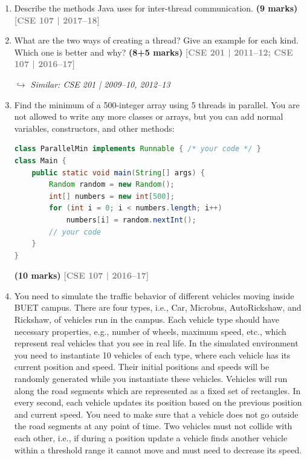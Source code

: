 \documentclass[12pt,a3paper]{article}
\newcommand{\yr}[1]{\hfill\textcolor{gray}{\small\textbf{[#1]}}}
\newcommand{\mk}[1]{\textcolor{orange!70!black}{\small\textbf{(#1 marks)}}}
\newcommand{\variant}[1]{\par\vspace{1pt}\textcolor{blue!50!black}%
  {\footnotesize\textit{$\hookrightarrow$ Similar: #1}}}
\begin{document}
\begin{enumerate}



\item Describe the methods Java uses for inter-thread communication. \mk{9}
\yr{CSE 107 | 2017--18}




\item What are the two ways of creating a thread? Give an example for each kind. Which one is better and why? \mk{8+5}
\yr{CSE 201 | 2011--12; CSE 107 | 2016--17}
\variant{CSE 201 | 2009--10, 2012--13}




\item Find the minimum of a 500-integer array using 5 threads in parallel. You are not allowed to write any more classes or arrays, but you can add normal variables, constructors, and other methods:
\begin{lstlisting}[language=Java]
class ParallelMin implements Runnable { /* your code */ }
class Main {
    public static void main(String[] args) {
        Random random = new Random();
        int[] numbers = new int[500];
        for (int i = 0; i < numbers.length; i++)
            numbers[i] = random.nextInt();
        // your code
    }
}
\end{lstlisting}
\mk{10}
\yr{CSE 107 | 2016--17}




\item You need to simulate the traffic behavior of different vehicles moving inside BUET
campus. There are four types, i.e., Car, Microbus, AutoRickshaw, and Rickshaw, of
vehicles run in the campus. Each vehicle type should have necessary properties, e.g.,
number of wheels, maximum speed, etc., which represent real vehicles that you see in
real life. In the simulated environment you need to instantiate 10 vehicles of each type,
where each vehicle has its current position and speed. Their initial positions and speeds
will be randomly generated while you instantiate these vehicles. Vehicles will run along
the road segments which are represented as a fixed set of rectangles. In every second,
each vehicle updates its position based on the previous position and current speed. You
need to make sure that a vehicle does not go outside the road segments at any point of
time. Two vehicles must not collide with each other, i.e., if during a position update a
vehicle finds another vehicle within a threshold range it cannot move and must need to
decrease its speed.


\end{enumerate}
\end{document}
